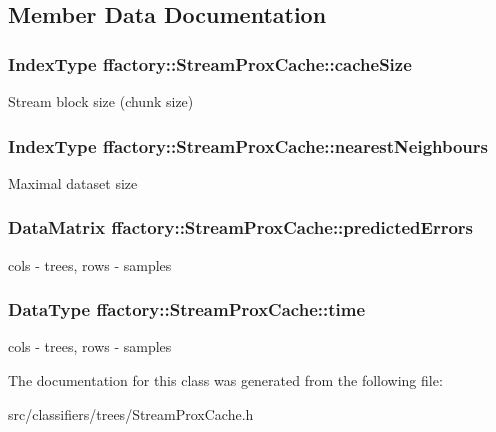 \subsection{Member Data Documentation}
\hypertarget{classffactory_1_1_stream_prox_cache_a994b7d54a8341bc3a4f20da808bc7f5c}{
\subsubsection[{cache\-Size}]{\setlength{\rightskip}{0pt plus 5cm}Index\-Type ffactory\-::\-Stream\-Prox\-Cache\-::cache\-Size\hspace{0.3cm}{\ttfamily [protected]}}}\label{classffactory_1_1_stream_prox_cache_a994b7d54a8341bc3a4f20da808bc7f5c}
Stream block size (chunk size) \hypertarget{classffactory_1_1_stream_prox_cache_a438552682a58bdd977b171d1ae568033}{
\subsubsection[{nearest\-Neighbours}]{\setlength{\rightskip}{0pt plus 5cm}Index\-Type ffactory\-::\-Stream\-Prox\-Cache\-::nearest\-Neighbours\hspace{0.3cm}{\ttfamily [protected]}}}\label{classffactory_1_1_stream_prox_cache_a438552682a58bdd977b171d1ae568033}
Maximal dataset size \hypertarget{classffactory_1_1_stream_prox_cache_a732bbc8e3b41d6fd9c12558bad80d031}{
\subsubsection[{predicted\-Errors}]{\setlength{\rightskip}{0pt plus 5cm}Data\-Matrix ffactory\-::\-Stream\-Prox\-Cache\-::predicted\-Errors\hspace{0.3cm}{\ttfamily [protected]}}}\label{classffactory_1_1_stream_prox_cache_a732bbc8e3b41d6fd9c12558bad80d031}
cols -\/ trees, rows -\/ samples \hypertarget{classffactory_1_1_stream_prox_cache_a3626cb46c72194156648c61c210203be}{
\subsubsection[{time}]{\setlength{\rightskip}{0pt plus 5cm}Data\-Type ffactory\-::\-Stream\-Prox\-Cache\-::time\hspace{0.3cm}{\ttfamily [protected]}}}\label{classffactory_1_1_stream_prox_cache_a3626cb46c72194156648c61c210203be}
cols -\/ trees, rows -\/ samples 

The documentation for this class was generated from the following file\-:\begin{DoxyCompactItemize}
\item 
src/classifiers/trees/Stream\-Prox\-Cache.\-h\end{DoxyCompactItemize}
